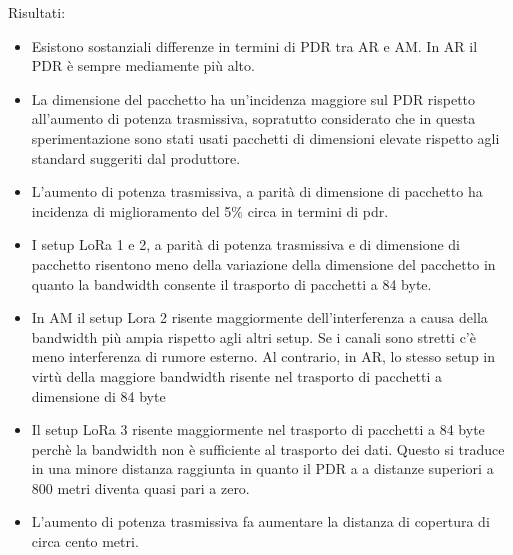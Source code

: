 \documentclass[12pt,a4paper,openright,twoside]{report}
\begin{document}
Risultati:
\begin{itemize}    
\item Esistono sostanziali differenze in termini di PDR tra AR e AM. In AR il PDR \`e sempre mediamente pi\`u alto.
\item La dimensione del pacchetto ha un'incidenza maggiore sul PDR rispetto all'aumento di potenza trasmissiva, sopratutto considerato che in questa sperimentazione sono stati usati pacchetti di dimensioni elevate rispetto agli standard suggeriti dal produttore.  
\item L'aumento di potenza trasmissiva, a parit\`a di dimensione di pacchetto ha incidenza di miglioramento del 5\% circa in termini di pdr.  
\item I setup LoRa 1 e 2, a parit\`a di potenza trasmissiva e di dimensione di pacchetto risentono meno della variazione della dimensione del pacchetto in quanto la bandwidth consente il trasporto di pacchetti a 84 byte.
\item In AM il setup Lora 2 risente maggiormente dell'interferenza a causa della bandwidth pi\`u ampia rispetto agli altri setup. Se i canali sono stretti c'\`e meno interferenza di rumore esterno. Al contrario, in AR, lo stesso setup in virt\`u della maggiore bandwidth risente nel trasporto di pacchetti a dimensione di 84 byte
\item Il setup LoRa 3 risente maggiormente nel trasporto di pacchetti a 84 byte perch\`e la bandwidth non \`e sufficiente al trasporto dei dati. Questo si traduce in una minore distanza raggiunta in quanto il PDR a a distanze superiori a 800 metri diventa quasi pari a zero. 
\item L'aumento di potenza trasmissiva fa aumentare la distanza di copertura di circa cento metri.
\end{itemize}
\end{document}
